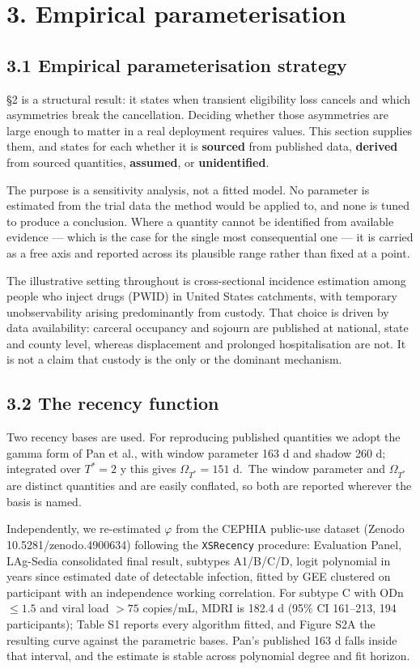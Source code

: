 \section{3. Empirical parameterisation}

\subsection{3.1 Empirical parameterisation strategy}

§2 is a structural result: it states when transient eligibility loss cancels and which asymmetries break the cancellation. Deciding whether those asymmetries are large enough to matter in a real deployment requires values. This section supplies them, and states for each whether it is \textbf{sourced} from published data, \textbf{derived} from sourced quantities, \textbf{assumed}, or \textbf{unidentified}.

The purpose is a sensitivity analysis, not a fitted model. No parameter is estimated from the trial data the method would be applied to, and none is tuned to produce a conclusion. Where a quantity cannot be identified from available evidence --- which is the case for the single most consequential one --- it is carried as a free axis and reported across its plausible range rather than fixed at a point.

The illustrative setting throughout is cross-sectional incidence estimation among people who inject drugs (PWID) in United States catchments, with temporary unobservability arising predominantly from custody. That choice is driven by data availability: carceral occupancy and sojourn are published at national, state and county level, whereas displacement and prolonged hospitalisation are not. It is not a claim that custody is the only or the dominant mechanism.

\subsection{3.2 The recency function}

Two recency bases are used. For reproducing published quantities we adopt the gamma form of Pan et al., with window parameter 163 d and shadow 260 d; integrated over \(T^*=2\) y this gives \(\Omega_{T^*}=151\) d.~The window parameter and \(\Omega_{T^*}\) are distinct quantities and are easily conflated, so both are reported wherever the basis is named.

Independently, we re-estimated \(\varphi\) from the CEPHIA public-use dataset (Zenodo 10.5281/zenodo.4900634) following the \texttt{XSRecency} procedure: Evaluation Panel, LAg-Sedia consolidated final result, subtypes A1/B/C/D, logit polynomial in years since estimated date of detectable infection, fitted by GEE clustered on participant with an independence working correlation. For subtype C with ODn \(\le1.5\) and viral load \(>75\) copies/mL, MDRI is 182.4 d (95\% CI 161--213, 194 participants); Table S1 reports every algorithm fitted, and Figure S2A the resulting curve against the parametric bases. Pan's published 163 d falls inside that interval, and the estimate is stable across polynomial degree and fit horizon.

